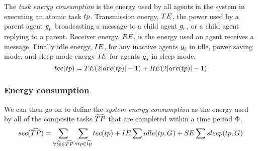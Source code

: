 \newcommand{\functionTaskEnergyConsumption}[2]{
	\functionSignature{tec}
	{\varAtomicTask{}{}}
}
The \textit{task energy consumption} is the energy used by all agents in the system in executing an atomic task $\varAtomicTask{}{}$. Transmission energy, $TE$, the power used by a parent agent $g_{p}^{}$ broadcasting a message to a child agent $g_{c}^{}$, or a child agent replying to a parent. Receiver energy, $RE$, is the energy used an agent receives a message. Finally idle energy, $IE$, for any inactive agents $g_{i}^{}$ in idle, power saving mode, and sleep mode energy $IE$ for agents $g_{s}^{}$ in sleep mode.
\begin{equation}
	\functionTaskEnergyConsumption{}{} 
	= \varTransmissionEnergy{}{} (2\funcSize{\functionTaskArc{}{}}{} - 1)
	+ \varReceiverEnergy{}{} (2\funcSize{\functionTaskArc{}{}}{} - 1)
	
\end{equation}
\subsubsection{Energy consumption}
\newcommand{\functionSystemEnergyConsumption}[2]{
	\functionSignature{sec}
	{\setCompositeTask{}{}}
}
We can then go on to define the \textit{system energy consumption} as the energy used by all of the composite tasks $\setCompositeTask{}{}$ that are completed within a time period $\Phi$.
\begin{equation}
	\functionSystemEnergyConsumption{}{} 
	= 
	\sum_{\forall \varCompositeTask{}{} \in \setCompositeTask{}{}}
	\sum_{\forall \varAtomicTask{}{} \in \varCompositeTask{}{}} \functionTaskEnergyConsumption{}{}
	+ \varIdleEnergy{}{} \sum \functionIdleRole{}{}
	+ \varSleepEnergy{}{} \sum \functionSleepRole{}{}
\end{equation}


